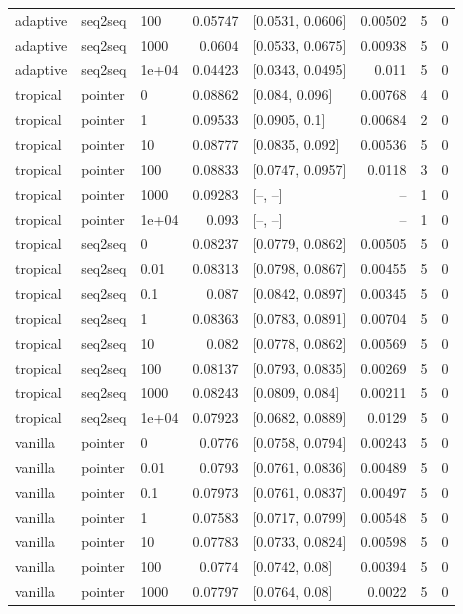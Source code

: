 \documentclass[10pt]{article}
\begin{document}
{\begin{longtable}{lllrlrrr}
adaptive & seq2seq & 100 & 0.05747 & [0.0531, 0.0606] & 0.00502 & 5 & 0\\
adaptive & seq2seq & 1000 & 0.0604 & [0.0533, 0.0675] & 0.00938 & 5 & 0\\
adaptive & seq2seq & 1e+04 & 0.04423 & [0.0343, 0.0495] & 0.011 & 5 & 0\\
tropical & pointer & 0 & 0.08862 & [0.084, 0.096] & 0.00768 & 4 & 0\\
tropical & pointer & 1 & 0.09533 & [0.0905, 0.1] & 0.00684 & 2 & 0\\
tropical & pointer & 10 & 0.08777 & [0.0835, 0.092] & 0.00536 & 5 & 0\\
tropical & pointer & 100 & 0.08833 & [0.0747, 0.0957] & 0.0118 & 3 & 0\\
tropical & pointer & 1000 & 0.09283 & [--, --] & -- & 1 & 0\\
tropical & pointer & 1e+04 & 0.093 & [--, --] & -- & 1 & 0\\
tropical & seq2seq & 0 & 0.08237 & [0.0779, 0.0862] & 0.00505 & 5 & 0\\
tropical & seq2seq & 0.01 & 0.08313 & [0.0798, 0.0867] & 0.00455 & 5 & 0\\
tropical & seq2seq & 0.1 & 0.087 & [0.0842, 0.0897] & 0.00345 & 5 & 0\\
tropical & seq2seq & 1 & 0.08363 & [0.0783, 0.0891] & 0.00704 & 5 & 0\\
tropical & seq2seq & 10 & 0.082 & [0.0778, 0.0862] & 0.00569 & 5 & 0\\
tropical & seq2seq & 100 & 0.08137 & [0.0793, 0.0835] & 0.00269 & 5 & 0\\
tropical & seq2seq & 1000 & 0.08243 & [0.0809, 0.084] & 0.00211 & 5 & 0\\
tropical & seq2seq & 1e+04 & 0.07923 & [0.0682, 0.0889] & 0.0129 & 5 & 0\\
vanilla & pointer & 0 & 0.0776 & [0.0758, 0.0794] & 0.00243 & 5 & 0\\
vanilla & pointer & 0.01 & 0.0793 & [0.0761, 0.0836] & 0.00489 & 5 & 0\\
vanilla & pointer & 0.1 & 0.07973 & [0.0761, 0.0837] & 0.00497 & 5 & 0\\
vanilla & pointer & 1 & 0.07583 & [0.0717, 0.0799] & 0.00548 & 5 & 0\\
vanilla & pointer & 10 & 0.07783 & [0.0733, 0.0824] & 0.00598 & 5 & 0\\
vanilla & pointer & 100 & 0.0774 & [0.0742, 0.08] & 0.00394 & 5 & 0\\
vanilla & pointer & 1000 & 0.07797 & [0.0764, 0.08] & 0.0022 & 5 & 0\\

\end{longtable}}
\end{document}

